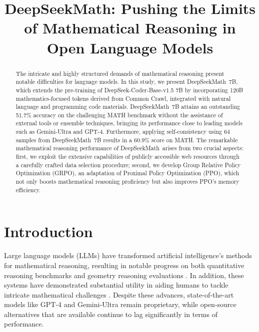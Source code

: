 \title{DeepSeekMath: Pushing the Limits of Mathematical Reasoning in Open Language Models}

\begin{abstract}
The intricate and highly structured demands of mathematical reasoning present notable difficulties for language models. In this study, we present DeepSeekMath~7B, which extends the pre-training of DeepSeek-Coder-Base-v1.5 7B by incorporating 120B mathematics-focused tokens derived from Common Crawl, integrated with natural language and programming code materials. DeepSeekMath~7B attains an outstanding 51.7\% accuracy on the challenging MATH benchmark without the assistance of external tools or ensemble techniques, bringing its performance close to leading models such as Gemini-Ultra and GPT-4. Furthermore, applying self-consistency using 64 samples from DeepSeekMath~7B results in a 60.9\% score on MATH. The remarkable mathematical reasoning performance of DeepSeekMath~arises from two crucial aspects: first, we exploit the extensive capabilities of publicly accessible web resources through a carefully crafted data selection procedure; second, we develop Group Relative Policy Optimization (GRPO), an adaptation of Proximal Policy Optimization (PPO), which not only boosts mathematical reasoning proficiency but also improves PPO's memory efficiency.
\end{abstract}

\section{Introduction}

Large language models (LLMs) have transformed artificial intelligence’s methods for mathematical reasoning, resulting in notable progress on both quantitative reasoning benchmarks \citep{MATH} and geometry reasoning evaluations \citep{trinh2024solving}. In addition, these systems have demonstrated substantial utility in aiding humans to tackle intricate mathematical challenges \citep{tao}. Despite these advances, state-of-the-art models like GPT-4 \citep{gpt4} and Gemini-Ultra \citep{gemini} remain proprietary, while open-source alternatives that are available continue to lag significantly in terms of performance.

